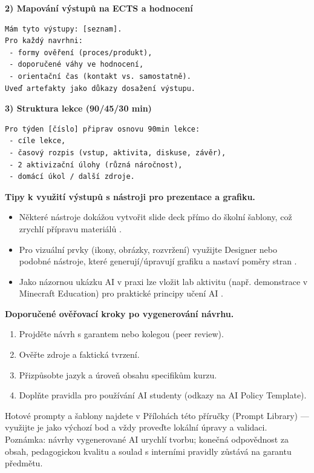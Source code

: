 \textbf{2) Mapování výstupů na ECTS a hodnocení}
\begin{verbatim}
Mám tyto výstupy: [seznam].
Pro každý navrhni:
 - formy ověření (proces/produkt),
 - doporučené váhy ve hodnocení,
 - orientační čas (kontakt vs. samostatně).
Uveď artefakty jako důkazy dosažení výstupu.
\end{verbatim}

\textbf{3) Struktura lekce (90/45/30 min)}
\begin{verbatim}
Pro týden [číslo] připrav osnovu 90min lekce:
 - cíle lekce,
 - časový rozpis (vstup, aktivita, diskuse, závěr),
 - 2 aktivizační úlohy (různá náročnost),
 - domácí úkol / další zdroje.
\end{verbatim}

\medskip
\textbf{Tipy k využití výstupů s nástroji pro prezentace a grafiku.}
\begin{itemize}
  \item Některé nástroje dokážou vytvořit slide deck přímo do školní šablony, což zrychlí přípravu materiálů \cite{kb_ai_101_tipu_pdf_04e4a115_page_44_2}.
  \item Pro vizuální prvky (ikony, obrázky, rozvržení) využijte Designer nebo podobné nástroje, které generují/úpravují grafiku a nastaví poměry stran \cite{kb_ai_101_tipu_pdf_04e4a115_page_51_1}.
  \item Jako názornou ukázku AI v praxi lze vložit lab aktivitu (např. demonstrace v Minecraft Education) pro praktické principy učení AI \cite{kb_ai_101_tipu_pdf_04e4a115_page_15_2}.
\end{itemize}

\medskip
\textbf{Doporučené ověřovací kroky po vygenerování návrhu.}
\begin{enumerate}
  \item Projděte návrh s garantem nebo kolegou (peer review).
  \item Ověřte zdroje a faktická tvrzení.
  \item Přizpůsobte jazyk a úroveň obsahu specifikům kurzu.
  \item Doplňte pravidla pro používání AI studenty (odkazy na AI Policy Template).
\end{enumerate}

\medskip
Hotové prompty a šablony najdete v Přílohách této příručky (Prompt Library) — využijte je jako výchozí bod a vždy proveďte lokální úpravy a validaci. Poznámka: návrhy vygenerované AI urychlí tvorbu; konečná odpovědnost za obsah, pedagogickou kvalitu a soulad s interními pravidly zůstává na garantu předmětu.